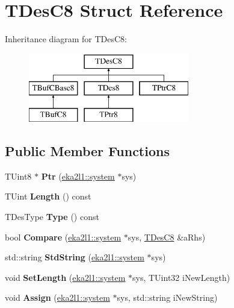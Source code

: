 \hypertarget{struct_t_des_c8}{}\section{T\+Des\+C8 Struct Reference}
\label{struct_t_des_c8}
Inheritance diagram for T\+Des\+C8\+:\begin{figure}[H]
\begin{center}
\leavevmode
\includegraphics[height=3.000000cm]{struct_t_des_c8}
\end{center}
\end{figure}
\subsection*{Public Member Functions}
\begin{DoxyCompactItemize}
\item 
\mbox{\label{struct_t_des_c8_ab824ba319f92e7de46b3077ded90221b}} 
T\+Uint8 $\ast$ {\bfseries Ptr} (\mbox{\hyperlink{classeka2l1_1_1system}{eka2l1\+::system}} $\ast$sys)
\item 
\mbox{\label{struct_t_des_c8_a2ae018667c639381c3f42fbc82d9d720}} 
T\+Uint {\bfseries Length} () const
\item 
\mbox{\label{struct_t_des_c8_a99d23fd9dead08f423894fd3d564faed}} 
T\+Des\+Type {\bfseries Type} () const
\item 
\mbox{\label{struct_t_des_c8_a7c0d024103c798e66c155a70f10aaa81}} 
bool {\bfseries Compare} (\mbox{\hyperlink{classeka2l1_1_1system}{eka2l1\+::system}} $\ast$sys, \mbox{\hyperlink{struct_t_des_c8}{T\+Des\+C8}} \&a\+Rhs)
\item 
\mbox{\label{struct_t_des_c8_a2cb60c9072fca60448fde8468aaf3ff9}} 
std\+::string {\bfseries Std\+String} (\mbox{\hyperlink{classeka2l1_1_1system}{eka2l1\+::system}} $\ast$sys)
\item 
\mbox{\label{struct_t_des_c8_a83ce39caf9ee6d66d1c83852a3e28314}} 
void {\bfseries Set\+Length} (\mbox{\hyperlink{classeka2l1_1_1system}{eka2l1\+::system}} $\ast$sys, T\+Uint32 i\+New\+Length)
\item 
\mbox{\label{struct_t_des_c8_a8967b6c4fd4f0f49080b874d362fae5f}} 
void {\bfseries Assign} (\mbox{\hyperlink{classeka2l1_1_1system}{eka2l1\+::system}} $\ast$sys, std\+::string i\+New\+String)
\end{DoxyCompactItemize}
